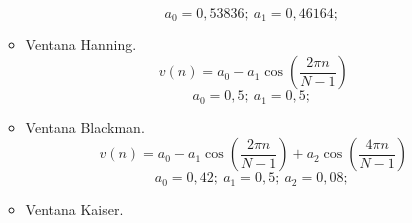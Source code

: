 \documentclass[a4paper,12pt]{article}
\begin{document}
\begin{enumerate}
\begin{itemize}
$$ a_0 = 0,53836;\ a_1 = 0,46164;\ $$
\item Ventana Hanning.
$$v(n) = a_0 - a_1 \cos(\frac{2 \pi n}{N -1})$$
$$ a_0 = 0,5;\ a_1 = 0,5;\ $$
\item Ventana Blackman.
$$v(n) = a_0 - a_1 \cos(\frac{2 \pi n}{N -1}) + a_2 \cos(\frac{4 \pi n}{N -1})$$
$$ a_0 = 0,42;\ a_1 = 0,5;\ a_2 = 0,08;\ $$
\item Ventana Kaiser.

\end{itemize}
\end{enumerate}
\end{document}
